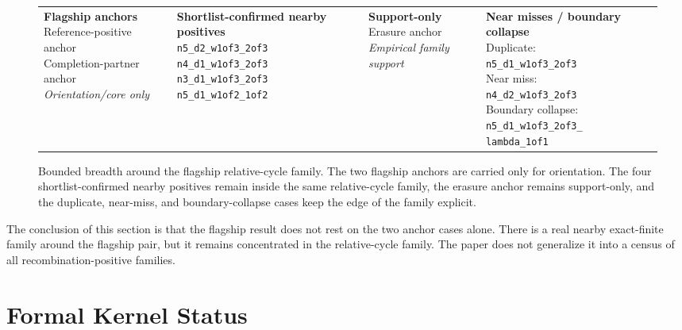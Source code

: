 \documentclass[11pt]{article}
\theoremstyle{definition}
\begin{document}
\begin{figure}[t]
\centering
\small
\setlength{\fboxsep}{6pt}
\begin{tabular}{p{}p{}p{}p{}}
\fbox{\parbox[c][4.7cm][t]{0.20\textwidth}{\textbf{Flagship anchors}\\[0.4em]
Reference-positive anchor\\
Completion-partner anchor\\[0.4em]
\emph{Orientation/core only}}} &
\fbox{\parbox[c][4.7cm][t]{0.20\textwidth}{\textbf{Shortlist-confirmed nearby positives}\\[0.4em]
\texttt{n5\_d2\_w1of3\_2of3}\\
\texttt{n4\_d1\_w1of3\_2of3}\\
\texttt{n3\_d1\_w1of3\_2of3}\\
\texttt{n5\_d1\_w1of2\_1of2}}} &
\fbox{\parbox[c][4.7cm][t]{0.20\textwidth}{\textbf{Support-only}\\[0.4em]
Erasure anchor\\[0.4em]
\emph{Empirical family support}}} &
\fbox{\parbox[c][4.7cm][t]{0.20\textwidth}{\textbf{Near misses / boundary collapse}\\[0.4em]
Duplicate:\\ \texttt{n5\_d1\_w1of3\_2of3}\\[0.3em]
Near miss:\\ \texttt{n4\_d2\_w1of3\_2of3}\\[0.3em]
Boundary collapse:\\ \texttt{n5\_d1\_w1of3\_2of3\_}\\ \texttt{lambda\_1of1}}}
\end{tabular}
\caption{Bounded breadth around the flagship relative-cycle family. The two flagship anchors are carried only for orientation. The four shortlist-confirmed nearby positives remain inside the same relative-cycle family, the erasure anchor remains support-only, and the duplicate, near-miss, and boundary-collapse cases keep the edge of the family explicit.}
\label{fig:route-a-breadth-and-near-misses}
\end{figure}
 
The conclusion of this section is that the flagship result does not rest on the two anchor cases alone. There is a real nearby exact-finite family around the flagship pair, but it remains concentrated in the relative-cycle family. The paper does not generalize it into a census of all recombination-positive families.

\section{Formal Kernel Status}
\end{document}
